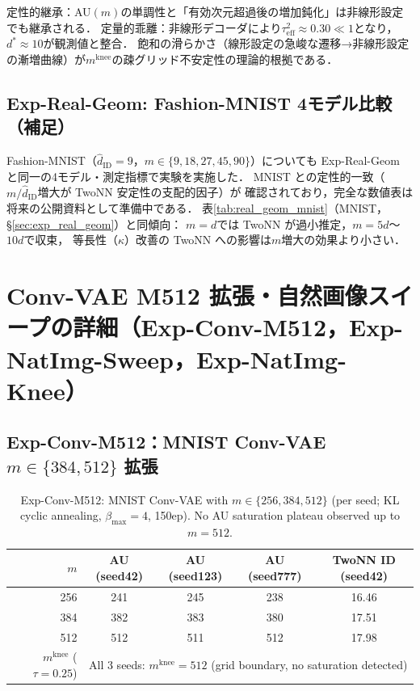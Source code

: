 \documentclass[11pt,a4paper]{jsarticle}
\newcommand{\kap}{\kappa}
\newcommand{\mknee}{m^{\mathrm{knee}}}
\begin{document}
定性的継承：AU$(m)$の単調性と「有効次元超過後の増加鈍化」は非線形設定でも継承される．
定量的乖離：非線形デコーダにより$\tau^2_\mathrm{eff} \approx 0.30 \ll 1$となり，$d^* \approx 10$が観測値と整合．
飽和の滑らかさ（線形設定の急峻な遷移→非線形設定の漸増曲線）が$\mknee$の疎グリッド不安定性の理論的根拠である．

\subsection*{Exp-Real-Geom: Fashion-MNIST 4モデル比較（補足）}

Fashion-MNIST（$\hat{d}_\mathrm{ID}=9$，$m \in \{9,18,27,45,90\}$）についても
Exp-Real-Geom と同一の4モデル・測定指標で実験を実施した．
MNIST との定性的一致（$m/\hat{d}_\mathrm{ID}$増大が TwoNN 安定性の支配的因子）が
確認されており，完全な数値表は将来の公開資料として準備中である．
表\ref{tab:real_geom_mnist}（MNIST，§\ref{sec:exp_real_geom}）と同傾向：
$m = d$では TwoNN が過小推定，$m = 5d$〜$10d$で収束，
等長性（$\kap$）改善の TwoNN への影響は$m$増大の効果より小さい．

\section{Conv-VAE M512 拡張・自然画像スイープの詳細（Exp-Conv-M512，Exp-NatImg-Sweep，Exp-NatImg-Knee）}\label{app:convvae_natimg}

\subsection*{Exp-Conv-M512：MNIST Conv-VAE $m \in \{384, 512\}$ 拡張}

\begin{table}[H]
\centering
\caption{Exp-Conv-M512: MNIST Conv-VAE with $m \in \{256, 384, 512\}$ (per seed; KL cyclic annealing, $\beta_\mathrm{max}=4$, 150ep). No AU saturation plateau observed up to $m=512$.}
\label{tab:en_ext}
\small
\begin{tabular}{r ccc c}
\toprule
$m$ & AU (seed42) & AU (seed123) & AU (seed777) & TwoNN ID (seed42) \\
\midrule
256 & 241 & 245 & 238 & 16.46 \\
384 & 382 & 383 & 380 & 17.51 \\
512 & 512 & 511 & 512 & 17.98 \\
\midrule
$\mknee$ ($\tau=0.25$) & \multicolumn{4}{c}{All 3 seeds: $\mknee=512$ (grid boundary, no saturation detected)} \\
\bottomrule
\end{tabular}
\end{table}
\end{document}
